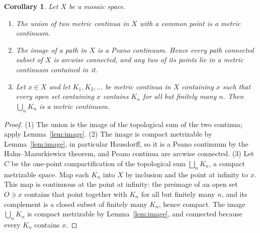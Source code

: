 \documentclass[11pt]{amsart}
\newtheorem{corollary}[theorem]{Corollary}
\theoremstyle{definition}
\theoremstyle{remark}
\numberwithin{equation}{section}
\begin{document}
\begin{corollary}\label{cor:image}
Let $X$ be a mosaic space.
\begin{enumerate}[label=\textup{(\arabic*)}]
\item The union of two metric continua in $X$ with a common point is a metric continuum.
\item The image of a path in $X$ is a Peano continuum. Hence every path connected subset of $X$ is arcwise connected, and any two of its points lie in a metric continuum contained in it.
\item Let $x\in X$ and let $K_1,K_2,\dots$ be metric continua in $X$ containing $x$ such that every open set containing $x$ contains $K_n$ for all but finitely many $n$. Then $\bigcup_nK_n$ is a metric continuum.
\end{enumerate}
\end{corollary}
\begin{proof}
(1) The union is the image of the topological sum of the two continua; apply Lemma~\ref{lem:image}. (2) The image is compact metrizable by Lemma~\ref{lem:image}, in particular Hausdorff, so it is a Peano continuum by the Hahn--Mazurkiewicz theorem, and Peano continua are arcwise connected. (3) Let $C$ be the one-point compactification of the topological sum $\bigsqcup_nK_n$, a compact metrizable space. Map each $K_n$ into $X$ by inclusion and the point at infinity to $x$. This map is continuous at the point at infinity: the preimage of an open set $O\ni x$ contains that point together with $K_n$ for all but finitely many $n$, and its complement is a closed subset of finitely many $K_n$, hence compact. The image $\bigcup_nK_n$ is compact metrizable by Lemma~\ref{lem:image}, and connected because every $K_n$ contains $x$.
\end{proof}
\end{document}
